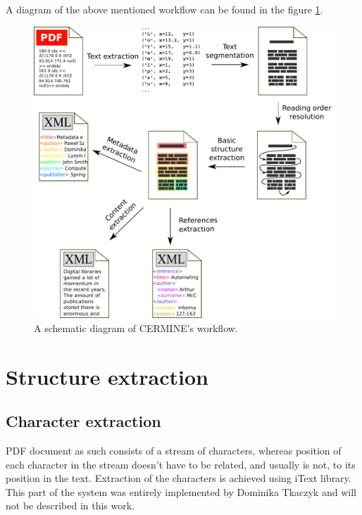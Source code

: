 A diagram of the above mentioned workflow can be found in the figure \ref{fig:pipeline}.
\begin{figure}[h]
  \centering
  \includegraphics[width=14cm]{graphics/pipeline}
  \caption{A schematic diagram of CERMINE's workflow.}
  \label{fig:pipeline}
\end{figure}

\section{Structure extraction}
\subsection{Character extraction}\label{sec:character_extraction}
PDF document as such consists of a stream of characters, whereas position of each character in the stream doesn't have to be related, and usually is not, to its position in the text. Extraction of the characters is achieved using iText library. This part of the system was entirely implemented by Dominika Tkaczyk and will not be described in this work.

